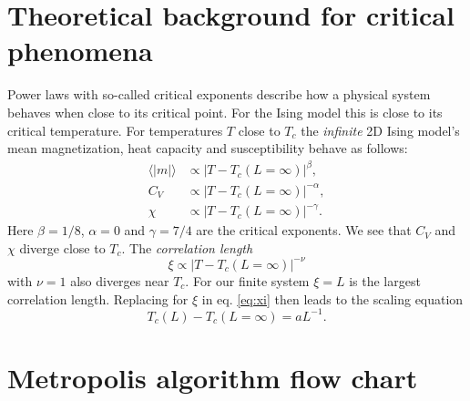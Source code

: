 \documentclass[english,notitlepage,reprint,nofootinbib]{revtex4-1}  %
\begin{document}
\newpage
\section{Theoretical background for critical phenomena}\label{appendix:critical}
Power laws with so-called critical exponents describe how a physical system behaves when close to its critical point. For the Ising model this is close to its critical temperature. For temperatures $T$ close to $T_c$ the \textit{infinite} 2D Ising model's mean magnetization, heat capacity and susceptibility behave as follows:
\begin{align*}
    \langle |m| \rangle & \propto |T-T_c(L = \infty)|^\beta,     \\
    C_V                 & \propto |T-T_c(L = \infty)|^{-\alpha}, \\
    \chi                & \propto |T-T_c(L = \infty)|^{-\gamma}.
\end{align*}
Here $\beta = 1/8$, $\alpha = 0$ and $\gamma = 7/4$ are the critical exponents. We see that $C_V$ and $\chi$ diverge close to $T_c$. The \textit{correlation length}
\begin{equation}
    \xi \propto |T-T_c(L=\infty)|^{-\nu} \label{eq:xi}
\end{equation}
with $\nu=1$ also diverges near $T_c$. For our finite system $\xi = L$ is the largest correlation length. Replacing for $\xi$ in eq. \ref{eq:xi} then leads to the scaling equation
\begin{equation}
    T_c(L) -T_c(L=\infty) = aL^{-1}.
\end{equation}

\section{Metropolis algorithm flow chart}\label{appendix:metro}
\end{document}
